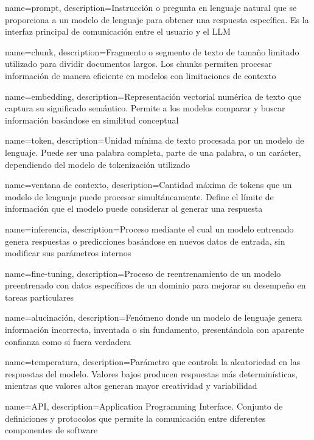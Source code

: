 {
    name=prompt,
    description={Instrucción o pregunta en lenguaje natural que se proporciona a un modelo de lenguaje para obtener una respuesta específica. Es la interfaz principal de comunicación entre el usuario y el LLM}
}

{
    name=chunk,
    description={Fragmento o segmento de texto de tamaño limitado utilizado para dividir documentos largos. Los chunks permiten procesar información de manera eficiente en modelos con limitaciones de contexto}
}

{
    name=embedding,
    description={Representación vectorial numérica de texto que captura su significado semántico. Permite a los modelos comparar y buscar información basándose en similitud conceptual}
}

{
    name=token,
    description={Unidad mínima de texto procesada por un modelo de lenguaje. Puede ser una palabra completa, parte de una palabra, o un carácter, dependiendo del modelo de tokenización utilizado}
}

{
    name=ventana de contexto,
    description={Cantidad máxima de tokens que un modelo de lenguaje puede procesar simultáneamente. Define el límite de información que el modelo puede considerar al generar una respuesta}
}

{
    name=inferencia,
    description={Proceso mediante el cual un modelo entrenado genera respuestas o predicciones basándose en nuevos datos de entrada, sin modificar sus parámetros internos}
}

{
    name=fine-tuning,
    description={Proceso de reentrenamiento de un modelo preentrenado con datos específicos de un dominio para mejorar su desempeño en tareas particulares}
}

{
    name=alucinación,
    description={Fenómeno donde un modelo de lenguaje genera información incorrecta, inventada o sin fundamento, presentándola con aparente confianza como si fuera verdadera}
}

{
    name=temperatura,
    description={Parámetro que controla la aleatoriedad en las respuestas del modelo. Valores bajos producen respuestas más determinísticas, mientras que valores altos generan mayor creatividad y variabilidad}
}

{
    name=API,
    description={Application Programming Interface. Conjunto de definiciones y protocolos que permite la comunicación entre diferentes componentes de software}
}

